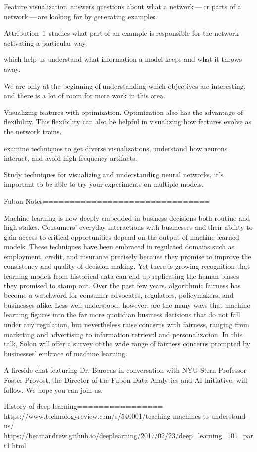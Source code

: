 Feature visualization answers questions about what a network — or parts of a network — are looking for by generating examples.

Attribution 1 studies what part of an example is responsible for the network activating a particular way.

which help us understand what information a model keeps and what it throws away. 

We are only at the beginning of understanding which objectives are interesting, and there is a lot of room for more work in this area.

Visualizing features with optimization. Optimization also has the advantage of flexibility. This flexibility can also be helpful in visualizing how features evolve as the network trains. 

examine techniques to get diverse visualizations, understand how neurons interact, and avoid high frequency artifacts.

Study techniques for visualizing and understanding neural networks, it's important to be able to try your experiments on multiple models.

Fubon Notes===============================

Machine learning is now deeply embedded in business decisions both routine and high-stakes. Consumers' everyday interactions with businesses and their ability to gain access to critical opportunities depend on the output of machine learned models. These techniques have been embraced in regulated domains such as employment, credit, and insurance precisely because they promise to improve the consistency and quality of decision-making. Yet there is growing recognition that learning models from historical data can end up replicating the human biases they promised to stamp out. Over the past few years, algorithmic fairness has become a watchword for consumer advocates, regulators, policymakers, and businesses alike. Less well understood, however, are the many ways that machine learning figures into the far more quotidian business decisions that do not fall under any regulation, but nevertheless raise concerns with fairness, ranging from marketing and advertising to information retrieval and personalization. In this talk, Solon will offer a survey of the wide range of fairness concerns prompted by businesses' embrace of machine learning.

A fireside chat featuring Dr. Barocas in conversation with NYU Stern Professor Foster Provost, the Director of the Fubon Data Analytics and AI Initiative, will follow. We hope you can join us.

History of deep learning================
https://www.technologyreview.com/s/540001/teaching-machines-to-understand-us/
https://beamandrew.github.io/deeplearning/2017/02/23/deep_learning_101_part1.html
